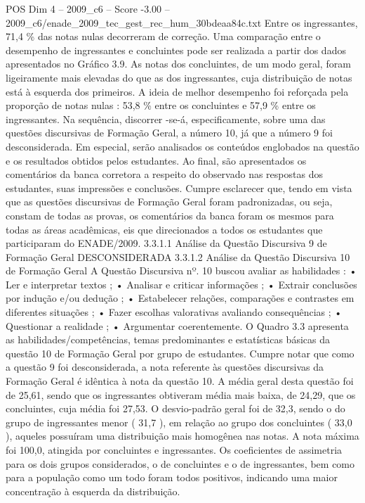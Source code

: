 \begin{textsample}{POS Dim 4 – 2009\_c6 – Score -3.00 – 2009\_c6/enade\_2009\_tec\_gest\_rec\_hum\_30bdeaa84c.txt}
Entre os ingressantes, 71,4 \% das notas nulas decorreram de correção.
Uma comparação entre o desempenho de ingressantes e concluintes pode ser realizada a partir dos dados apresentados no Gráfico 3.9.
As notas dos concluintes, de um modo geral, foram ligeiramente mais elevadas do que as dos ingressantes, cuja distribuição de notas está à esquerda dos primeiros.
A ideia de melhor desempenho foi reforçada pela proporção de notas nulas : 53,8 \% entre os concluintes e 57,9 \% entre os ingressantes.
Na sequência, discorrer -se-á, especificamente, sobre uma das questões discursivas de Formação Geral, a número 10, já que a número 9 foi desconsiderada.
Em especial, serão analisados os conteúdos englobados na questão e os resultados obtidos pelos estudantes.
Ao final, são apresentados os comentários da banca corretora a respeito do observado nas respostas dos estudantes, suas impressões e conclusões.
Cumpre esclarecer que, tendo em vista que as questões discursivas de Formação Geral foram padronizadas, ou seja, constam de todas as provas, os comentários da banca foram os mesmos para todas as áreas acadêmicas, eis que direcionados a todos os estudantes que participaram do ENADE/2009. 3.3.1.1 Análise da Questão Discursiva 9 de Formação Geral DESCONSIDERADA 3.3.1.2 Análise da Questão Discursiva 10 de Formação Geral A Questão Discursiva nº. 10 buscou avaliar as habilidades : • Ler e interpretar textos ; • Analisar e criticar informações ; • Extrair conclusões por indução e/ou dedução ; • Estabelecer relações, comparações e contrastes em diferentes situações ; • Fazer escolhas valorativas avaliando consequências ; • Questionar a realidade ; • Argumentar coerentemente.
O Quadro 3.3 apresenta as habilidades/competências, temas predominantes e estatísticas básicas da questão 10 de Formação Geral por grupo de estudantes.
Cumpre notar que como a questão 9 foi desconsiderada, a nota referente às questões discursivas da Formação Geral é idêntica à nota da questão 10.
A média geral desta questão foi de 25,61, sendo que os ingressantes obtiveram média mais baixa, de 24,29, que os concluintes, cuja média foi 27,53.
O desvio-padrão geral foi de 32,3, sendo o do grupo de ingressantes menor ( 31,7 ), em relação ao grupo dos concluintes ( 33,0 ), aqueles possuíram uma distribuição mais homogênea nas notas.
A nota máxima foi 100,0, atingida por concluintes e ingressantes.
Os coeficientes de assimetria para os dois grupos considerados, o de concluintes e o de ingressantes, bem como para a população como um todo foram todos positivos, indicando uma maior concentração à esquerda da distribuição.

\end{textsample}
